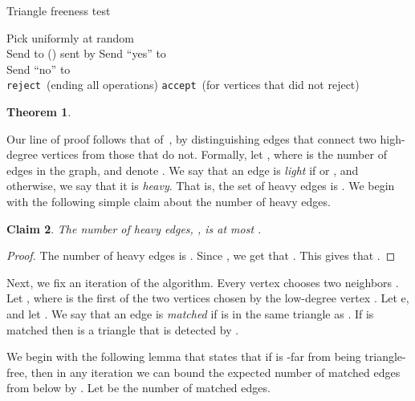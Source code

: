 \documentclass[11pt]{article}
\newtheorem{theorem}{Theorem}[section]
\newtheorem{claim}[theorem]{Claim}
\newcommand{\accept}{\texttt{accept}}
\newcommand{\reject}{\texttt{reject}}
\begin{document}
\begin{algorithm}[htbp]
\caption{Triangle freeness test\label{alg:triangle-freeness}}
{
	\Perform{}
	{	
		Pick  uniformly at random \\
		Send  to  
		\ForEach(){ sent by }
		{
			\If{}
			{
				Send ``yes'' to \\
			}
			\Else
			{
				Send ``no'' to \\
			}
		}
		{
					\reject ~(ending all operations)
		}
	}
}
\accept ~(for vertices that did not reject)
\end{algorithm}


\begin{theorem}
\label{thm:tri}
\ThmTri
\end{theorem}

Our line of proof follows that of~\cite{AKKR}, by distinguishing edges that connect two high-degree vertices from those that do not. Formally, let , where  is the number of edges in the graph, and denote . We say that an edge  is \emph{light} if  or , and otherwise, we say that it is \emph{heavy}. That is, the set of heavy edges is . We begin with the following simple claim about the number of heavy edges.

\begin{claim}
\label{claim:tri-heavy}
The number of heavy edges, , is at most .
\end{claim}

\begin{proof}
The number of heavy edges is . Since , we get that .
This gives that .
\end{proof}

Next, we fix an iteration  of the algorithm. Every vertex  chooses two neighbors . Let , where  is the first of the two vertices chosen by the low-degree vertex . Let e, and let .
We say that an edge  is \emph{matched} if  is in the same triangle as .
If  is matched then  is a triangle that is detected by .

We begin with the following lemma that states that if  is -far from being triangle-free, then in any iteration  we can bound the expected number of matched edges from below by . Let  be the number of matched edges.
\end{document}
